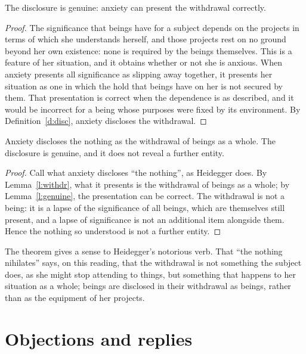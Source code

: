 \documentclass{situationist-preprint}
\begin{document}
\begin{lemma}\label{l:genuine}
The disclosure is genuine: anxiety can present the withdrawal correctly.
\end{lemma}

\begin{proof}
The significance that beings have for a subject depends on the projects in terms of which she understands herself, and those projects rest on no ground beyond her own existence: none is required by the beings themselves. This is a feature of her situation, and it obtains whether or not she is anxious. When anxiety presents all significance as slipping away together, it presents her situation as one in which the hold that beings have on her is not secured by them. That presentation is correct when the dependence is as described, and it would be incorrect for a being whose purposes were fixed by its environment. By Definition~\ref{d:disc}, anxiety discloses the withdrawal.
\end{proof}

\begin{theorem}\label{t:main}
Anxiety discloses the nothing as the withdrawal of beings as a whole. The disclosure is genuine, and it does not reveal a further entity.
\end{theorem}

\begin{proof}
Call what anxiety discloses \enquote{the nothing}, as Heidegger does. By Lemma~\ref{l:withdr}, what it presents is the withdrawal of beings as a whole; by Lemma~\ref{l:genuine}, the presentation can be correct. The withdrawal is not a being: it is a lapse of the significance of all beings, which are themselves still present, and a lapse of significance is not an additional item alongside them. Hence the nothing so understood is not a further entity.
\end{proof}

The theorem gives a sense to Heidegger's notorious verb. That \enquote{the nothing nihilates} says, on this reading, that the withdrawal is not something the subject does, as she might stop attending to things, but something that happens to her situation as a whole; beings are disclosed in their withdrawal as beings, rather than as the equipment of her projects.

\section{Objections and replies}
\end{document}
